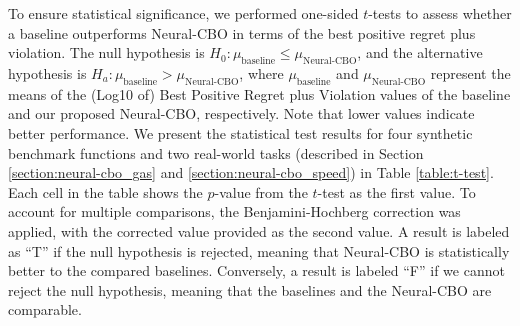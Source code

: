 To ensure statistical significance, we performed one-sided $t$-tests to assess whether a baseline outperforms Neural-CBO in terms of the best positive regret plus violation. The null hypothesis is $H_0: \mu_\text{baseline} \leq \mu_{\text{Neural-CBO}}$, and the alternative hypothesis is $H_a: \mu_\text{baseline} > \mu_{\text{Neural-CBO}}$, where $\mu_\text{baseline}$ and $\mu_{\text{Neural-CBO}}$ represent the means of the (Log10 of) Best Positive Regret plus Violation values of the baseline and our proposed Neural-CBO, respectively. Note that lower values indicate better performance. We present the statistical test results for four synthetic benchmark functions and two real-world tasks (described in Section \ref{section:neural-cbo_gas} and \ref{section:neural-cbo_speed}) in Table \ref{table:t-test}. Each cell in the table shows the $p$-value from the $t$-test as the first value. To account for multiple comparisons, the Benjamini-Hochberg correction was applied, with the corrected value provided as the second value. A result is labeled as ``T'' if the null hypothesis is rejected, meaning that Neural-CBO is statistically better to the compared baselines. Conversely, a result is labeled ``F'' if we cannot reject the null hypothesis, meaning that the baselines and the Neural-CBO are comparable.
\begin{table}[ht]
\caption{One-sided $t$-tests to evaluate whether the baseline outperforms Neural-CBO in terms of best positive regret plus violation.}
  \vspace{0.15in}
\end{table}


